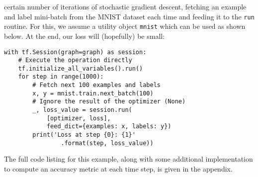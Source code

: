 certain number of iterations of stochastic gradient descent, fetching an example
and label mini-batch from the MNIST dataset each time and feeding it to the
\texttt{run} routine. For this, we assume a utility object \texttt{mnist} which
can be used as shown below. At the end, our loss will (hopefully) be small:
%
\begin{lstlisting}
with tf.Session(graph=graph) as session:
    # Execute the operation directly
    tf.initialize_all_variables().run()
    for step in range(1000):
        # Fetch next 100 examples and labels
        x, y = mnist.train.next_batch(100)
        # Ignore the result of the optimizer (None)
        _, loss_value = session.run(
            [optimizer, loss],
            feed_dict={examples: x, labels: y})
        print('Loss at step {0}: {1}'
                .format(step, loss_value))
\end{lstlisting}
%
The full code listing for this example, along with some additional
implementation to compute an accuracy metric at each time step, is given in the
appendix.

